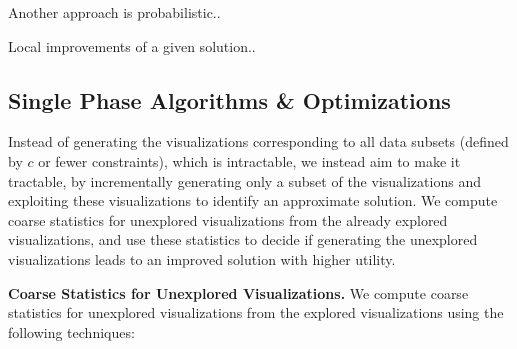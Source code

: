 Another approach is probabilistic..

Local improvements of a given solution..

\subsection{Single Phase Algorithms \& Optimizations}
Instead of generating the visualizations corresponding to all data subsets (defined by $c$ or fewer constraints), which is intractable, we instead aim to make it tractable, by incrementally generating only a subset of the visualizations and exploiting these visualizations to identify an approximate solution. We compute coarse statistics for unexplored visualizations from the already explored visualizations, and use these statistics to decide if generating the unexplored visualizations leads to an improved solution with higher utility.

\textbf{Coarse Statistics for Unexplored Visualizations.} We compute coarse statistics for unexplored visualizations from the explored visualizations using the following techniques:

